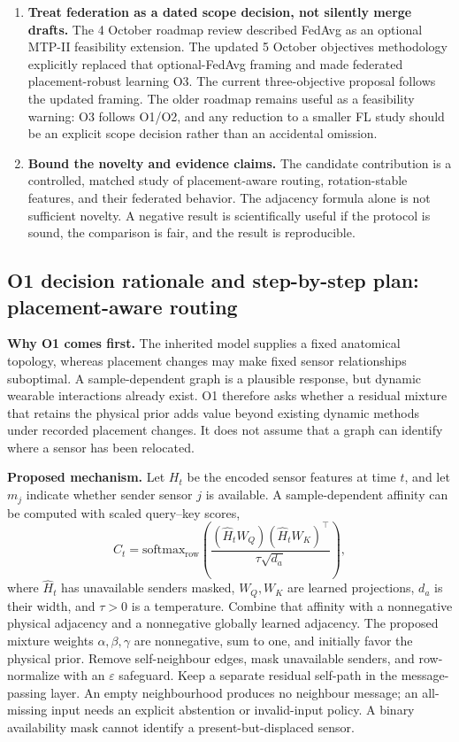 \documentclass[10pt,a4paper]{article}
\begin{document}
\begin{enumerate}
\item \textbf{Treat federation as a dated scope decision, not silently merge drafts.} The 4 October roadmap review described FedAvg as an optional MTP-II feasibility extension. The updated 5 October objectives methodology explicitly replaced that optional-FedAvg framing and made federated placement-robust learning O3. The current three-objective proposal follows the updated framing. The older roadmap remains useful as a feasibility warning: O3 follows O1/O2, and any reduction to a smaller FL study should be an explicit scope decision rather than an accidental omission.
\item \textbf{Bound the novelty and evidence claims.} The candidate contribution is a controlled, matched study of placement-aware routing, rotation-stable features, and their federated behavior. The adjacency formula alone is not sufficient novelty. A negative result is scientifically useful if the protocol is sound, the comparison is fair, and the result is reproducible.
\end{enumerate}

\subsection{O1 decision rationale and step-by-step plan: placement-aware routing}
\textbf{Why O1 comes first.} The inherited model supplies a fixed anatomical topology, whereas placement changes may make fixed sensor relationships suboptimal. A sample-dependent graph is a plausible response, but dynamic wearable interactions already exist. O1 therefore asks whether a residual mixture that retains the physical prior adds value beyond existing dynamic methods under recorded placement changes. It does not assume that a graph can identify where a sensor has been relocated.

\textbf{Proposed mechanism.} Let $H_t$ be the encoded sensor features at time $t$, and let $m_j$ indicate whether sender sensor $j$ is available. A sample-dependent affinity can be computed with scaled query--key scores,
\[
C_t=\mathrm{softmax}_{\mathrm{row}}\!\left(\frac{(\widehat H_tW_Q)(\widehat H_tW_K)^\top}{\tau\sqrt{d_a}}\right),
\]
where $\widehat H_t$ has unavailable senders masked, $W_Q,W_K$ are learned projections, $d_a$ is their width, and $\tau>0$ is a temperature. Combine that affinity with a nonnegative physical adjacency and a nonnegative globally learned adjacency. The proposed mixture weights $\alpha,\beta,\gamma$ are nonnegative, sum to one, and initially favor the physical prior. Remove self-neighbour edges, mask unavailable senders, and row-normalize with an $\varepsilon$ safeguard. Keep a separate residual self-path in the message-passing layer. An empty neighbourhood produces no neighbour message; an all-missing input needs an explicit abstention or invalid-input policy. A binary availability mask cannot identify a present-but-displaced sensor.
\end{document}
